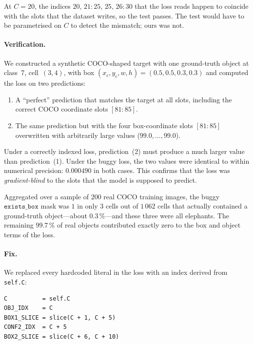 \noindent At $C=20$, the indices $20$, $21\!:\!25$, $25$, $26\!:\!30$ that the
loss reads happen to coincide with the slots that the dataset writes, so the
test passes. The test would have to be parametrised on $C$ to detect the
mismatch; ours was not.

\paragraph{Verification.} We constructed a synthetic COCO-shaped target with
one ground-truth object at class~7, cell~$(3,4)$, with box
$(x_c, y_c, w, h) = (0.5, 0.5, 0.3, 0.3)$ and computed the loss on two
predictions:

\begin{enumerate}
    \item A ``perfect'' prediction that matches the target at all slots,
        including the correct COCO coordinate slots $[81\!:\!85]$.
    \item The same prediction but with the four box-coordinate slots
        $[81\!:\!85]$ overwritten with arbitrarily large values
        ($99.0,\ldots,99.0$).
\end{enumerate}

Under a correctly indexed loss, prediction~(2) must produce a much larger
value than prediction~(1). Under the buggy loss, the two values were
identical to within numerical precision: $0.000490$ in both cases. This
confirms that the loss was \emph{gradient-blind} to the slots that the model
is supposed to predict.

Aggregated over a sample of 200 real COCO training images, the buggy
$\texttt{exists\_box}$ mask was $1$ in only 3 cells out of $1\,062$ cells that
actually contained a ground-truth object---about $0.3\,\%$---and these three
were all elephants. The remaining $99.7\,\%$ of real objects contributed
exactly zero to the box and object terms of the loss.

\paragraph{Fix.} We replaced every hardcoded literal in the loss with an index
derived from \texttt{self.C}:

\begin{lstlisting}[caption={Index variables introduced at the top of
    \texttt{YoloLoss.forward}.}]
C          = self.C
OBJ_IDX    = C
BOX1_SLICE = slice(C + 1, C + 5)
CONF2_IDX  = C + 5
BOX2_SLICE = slice(C + 6, C + 10)
\end{lstlisting}

